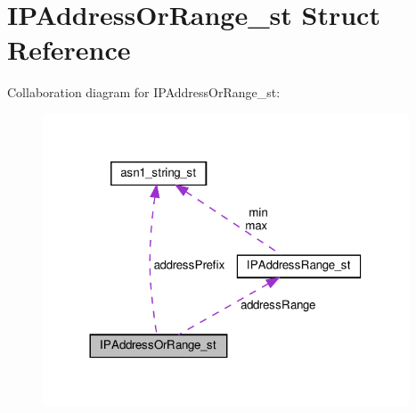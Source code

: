 \hypertarget{structIPAddressOrRange__st}{}\section{I\+P\+Address\+Or\+Range\+\_\+st Struct Reference}
\label{structIPAddressOrRange__st}


Collaboration diagram for I\+P\+Address\+Or\+Range\+\_\+st\+:
\nopagebreak
\begin{figure}[H]
\begin{center}
\leavevmode
\includegraphics[width=308pt]{structIPAddressOrRange__st__coll__graph}
\end{center}
\end{figure}
